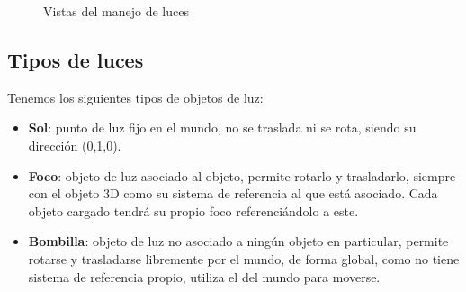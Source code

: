 \documentclass[12pt,a4paper]{article}
\begin{document}
\begin{figure}[H]
\hfill
{}\hfill
{}
\caption{Vistas del manejo de luces}
\end{figure}

\subsection{Tipos de luces}

Tenemos los siguientes tipos de objetos de luz:

\begin{itemize}
\item \textbf{Sol}: punto de luz fijo en el mundo, no se traslada ni se rota, siendo su dirección (0,1,0).
\item \textbf{Foco}: objeto de luz asociado al objeto, permite rotarlo y trasladarlo, siempre con el objeto 3D como su sistema de referencia al que está asociado. Cada objeto cargado tendrá su propio foco referenciándolo a este.
\item \textbf{Bombilla}: objeto de luz no asociado a ningún objeto en particular, permite rotarse y trasladarse libremente por el mundo, de forma global,  como no tiene sistema de referencia propio, utiliza el del mundo para moverse.
\end{itemize}
\end{document}
